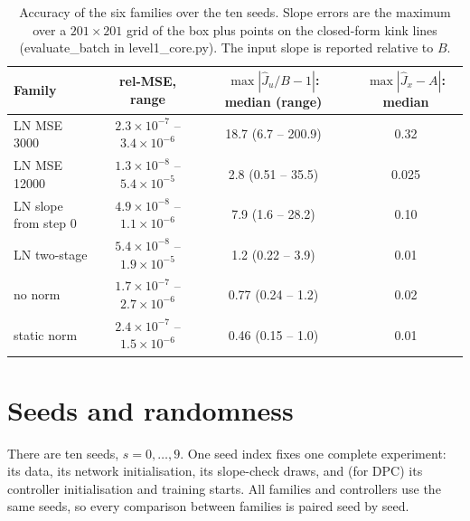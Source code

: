 \documentclass[11pt]{article}
\begin{document}
\begin{table}[H]
\centering
\small
\setlength{\tabcolsep}{4pt}
\begin{tabular}{lccc}
\toprule
Family & rel-MSE, range & $\max|\hat J_u/B-1|$: median (range) & $\max|\hat J_x-A|$: median \\
\midrule
LN MSE 3000 & $2.3\times10^{-7}$ -- $3.4\times10^{-6}$ & 18.7 (6.7 -- 200.9) & 0.32 \\
LN MSE 12000 & $1.3\times10^{-8}$ -- $5.4\times10^{-5}$ & 2.8 (0.51 -- 35.5) & 0.025 \\
LN slope from step 0 & $4.9\times10^{-8}$ -- $1.1\times10^{-6}$ & 7.9 (1.6 -- 28.2) & 0.10 \\
LN two-stage & $5.4\times10^{-8}$ -- $1.9\times10^{-5}$ & 1.2 (0.22 -- 3.9) & 0.01 \\
no norm & $1.7\times10^{-7}$ -- $2.7\times10^{-6}$ & 0.77 (0.24 -- 1.2) & 0.02 \\
static norm & $2.4\times10^{-7}$ -- $1.5\times10^{-6}$ & 0.46 (0.15 -- 1.0) & 0.01 \\
\bottomrule
\end{tabular}
\caption{Accuracy of the six families over the ten seeds. Slope errors are the maximum over a $201\times201$ grid of the box plus points on the closed-form kink lines (evaluate\_batch in level1\_core.py). The input slope is reported relative to $B$.}
\label{tab:acc}
\end{table}

\section{Seeds and randomness}\label{sec:seeds}

There are ten seeds, $s=0,\dots,9$. One seed index fixes one complete experiment: its data, its network initialisation, its slope-check draws, and (for DPC) its controller initialisation and training starts. All families and controllers use the same seeds, so every comparison between families is paired seed by seed.
\end{document}
